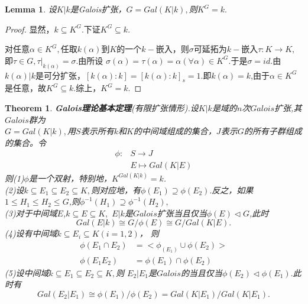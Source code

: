\documentclass[UTF8]{article}
\newtheorem{thm}{Theorem}[section]
\newtheorem{lem}{Lemma}[section]
\begin{document}
\begin{lem}设$K|k$是Galois扩张，$G=Gal(K|k),$则$K^{G}=k.$
	\end{lem}
\begin{proof}
	显然，$k\subseteq K^{G}.$下证$K^{G}\subseteq k.$
	
	对任意$\alpha\in K^{G},$任取$k(\alpha)$到$K$的一个$k-$嵌入，则$\sigma$可延拓为$k-$嵌入$\tau:K\rightarrow K,$
	即$\tau\in G,
	\tau|_{k(\alpha)}=\sigma.$由所设
	$\sigma (\alpha)=\tau(\alpha)=\alpha(\forall \alpha)\in K^{G}$.于是$\sigma=id.$由$k(\alpha)|k$是可分扩张，$[k(\alpha):k]=[k(\alpha):k]_{s}=1.$即$k(\alpha)=k$,由于$\alpha\in K^{G}$是任意，故$K^{G}\subseteq k.$综上，$K^{G}=k.$
\end{proof}

\begin{thm}
\textbf{Galois理论基本定理}(有限扩张情形).设$K|k$是域的$n$次$Galois$扩张,其$Galois$群为\\
$G=Gal(K|k),$用$S$表示所有$k$和$K$的中间域组成的集合，$J$表示$G$的所有子群组成的集合。令
\[\begin{split}
\phi:&S\rightarrow J\\
&E\mapsto Gal(K|E)
\end{split}
\]
则(1)$\phi$是一个双射，特别地，$K^{Gal(K|k)}=k$.\\
(2)设$k\subseteq E_{1}\subseteq E_{2}\subseteq K,$则对应地，有$\phi(E_{1})\supseteq \phi(E_{2}).$反之，如果
$1\leq H_{1}\leq H_{2}\leq G$,则$\phi^{-1}(H_{1})\supseteq \phi^{-1}(H_{2}),$\\
(3)对于中间域$E$,$k\subseteq E\subseteq K,$ $E|k$是$Galois$扩张当且仅当$\phi(E)\triangleleft G$,此时
$$
Gal(E|k)\cong G/\phi(E)\cong G/Gal(K|E).
$$
(4)设有中间域$k\subseteq E_{i}\subseteq K(i=1,2)$，
则 
\[
\begin{split}
\phi(E_{1}\cap E_{2})&=<\phi_(E_{1})\cup \phi(E_{2})>\\
\phi(E_{1}E_{2})&=\phi(E_{1})\cap \phi(E_{2})
\end{split}
\]
(5)设中间域$k\subseteq E_{1}\subseteq E_{2}\subseteq K,$则
$E_{2}|E_{1}$是$Galois$的当且仅当$\phi(E_{2})\triangleleft \phi(E_{1}).$此时有
$$
Gal(E_{2}|E_{1})\cong \phi(E_{1})/\phi(E_{2})=Gal(K|E_{1})/Gal(K|E_{1}).
$$
\end{thm}
\end{document}
